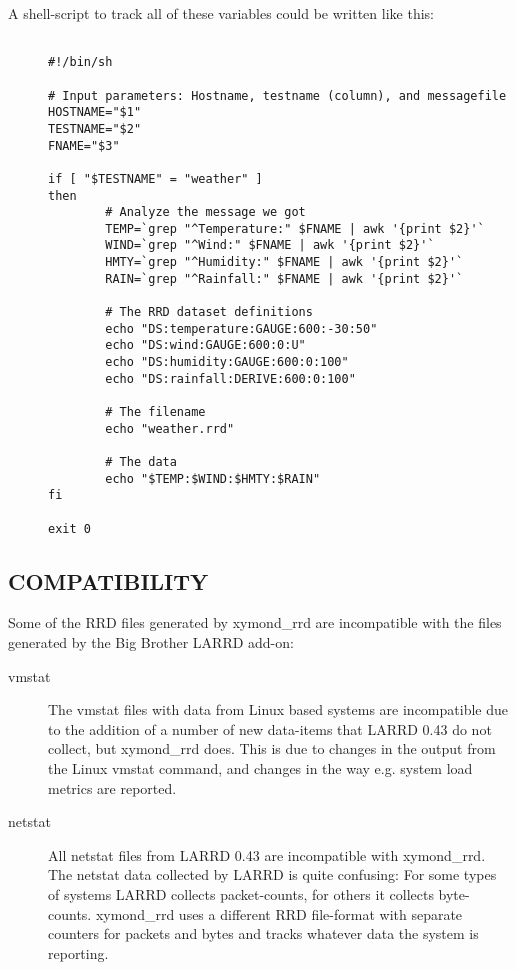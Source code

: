   A shell-script to track all of these variables could be written like this: \begin{description}
\item[]\begin{verbatim}

#!/bin/sh

# Input parameters: Hostname, testname (column), and messagefile
HOSTNAME="$1"
TESTNAME="$2"
FNAME="$3"

if [ "$TESTNAME" = "weather" ]
then
        # Analyze the message we got
        TEMP=`grep "^Temperature:" $FNAME | awk '{print $2}'`
        WIND=`grep "^Wind:" $FNAME | awk '{print $2}'`
        HMTY=`grep "^Humidity:" $FNAME | awk '{print $2}'`
        RAIN=`grep "^Rainfall:" $FNAME | awk '{print $2}'`

        # The RRD dataset definitions
        echo "DS:temperature:GAUGE:600:-30:50"
        echo "DS:wind:GAUGE:600:0:U"
        echo "DS:humidity:GAUGE:600:0:100"
        echo "DS:rainfall:DERIVE:600:0:100"

        # The filename
        echo "weather.rrd"

        # The data
        echo "$TEMP:$WIND:$HMTY:$RAIN"
fi

exit 0

\end{verbatim}


 


 


\end{description}

\subsection{COMPATIBILITY}


  Some of the RRD files generated by xymond\_rrd are incompatible
  with the files generated by the Big Brother LARRD add-on: 



\begin{description}

\item[vmstat] The vmstat files with data from Linux based systems are
  incompatible due to the addition of a number of new data-items that
  LARRD 0.43 do not collect, but xymond\_rrd does. This is due to
  changes in the output from the Linux vmstat command, and changes in
  the way e.g. system load metrics are reported. 
 

\item[netstat] All netstat files from LARRD 0.43 are incompatible with
  xymond\_rrd. The netstat data collected by LARRD is quite
  confusing: For some types of systems LARRD collects packet-counts,
  for others it collects byte- counts. xymond\_rrd uses a different
  RRD file-format with separate counters for packets and bytes and
  tracks whatever data the system is reporting. 


 


 


\end{description}

